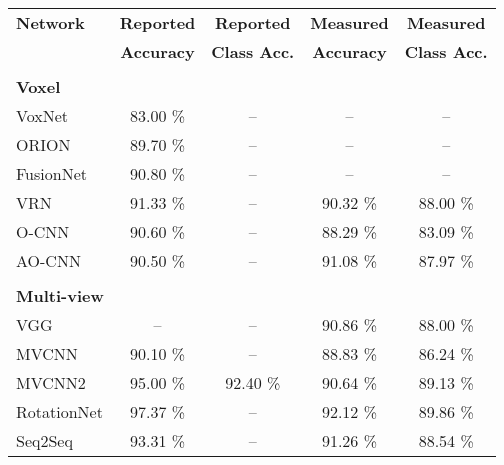 \begin{table}[]
	\centering
	\begin{tabular}{lcccc}
		\hline
		\textbf{Network}     & \textbf{Reported } &  \textbf{Reported}  & \textbf{Measured} &  \textbf{Measured}  \\
		                     & \textbf{Accuracy } & \textbf{Class Acc.} & \textbf{Accuracy} & \textbf{Class Acc.} \\ \hline
		                     &                    &                     &                   &                     \\
		\textbf{Voxel }      &                    &                     &                   &                     \\
		VoxNet               &      83.00 \%      &         --          &        --         &         --          \\
		ORION                &      89.70 \%      &         --          &        --         &         --          \\
		FusionNet            &      90.80 \%      &         --          &        --         &          --             \\
		VRN                  &      91.33 \%      &         --          &     90.32 \%      &      88.00 \%       \\
		O-CNN                &      90.60 \%      &         --          &     88.29 \%      &      83.09 \%       \\
		AO-CNN               &      90.50 \%      &         --          &     91.08 \%      &      87.97 \%       \\ \hline
		                     &                    &                     &                   &                     \\
		\textbf{Multi-view}  &                    &                     &                   &                     \\
		VGG                  &         --         &         --          &     90.86 \%      &      88.00 \%       \\
		MVCNN                &      90.10 \%      &         --          &     88.83 \%      &      86.24 \%       \\
		MVCNN2               &      95.00 \%      &      92.40 \%       &     90.64 \%      &      89.13 \%       \\
		RotationNet          &      97.37 \%      &         --          &     92.12 \%      &      89.86 \%       \\
		Seq2Seq              &      93.31 \%      &         --          &     91.26 \%      &      88.54 \%       \\ \hline

\end{tabular}
\end{table}
